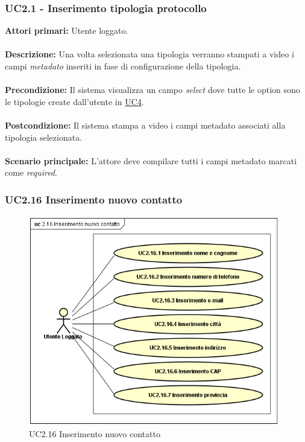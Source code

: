 \subsubsection{UC2.1 - Inserimento tipologia protocollo}
    \label{UC2.1}
    \textbf{Attori primari:} Utente loggato.
    \\
    \\
    \textbf{Descrizione:} Una volta selezionata una tipologia verranno stampati a video i campi \emph{metadato }\glsfirstoccur inseriti in fase di configurazione della tipologia.
    \\
    \\
    \textbf{Precondizione:} Il sistema visualizza un campo \textit{select} dove tutte le option sono le tipologie create dall'utente in \hyperref[UC4]{UC4}.
    \\
    \\
    \textbf{Postcondizione:} Il sistema stampa a video i campi metadato associati alla tipologia selezionata.
    \\
    \\
    \textbf{Scenario principale:} L'attore deve compilare tutti i campi metadato marcati come \textit{required}.
\newpage

\subsubsection{UC2.16 Inserimento nuovo contatto}
    \label{UC2.16}
    \begin{figure}[!h] 
        \centering 
        \includegraphics[width = 11cm]{immagini/UseCase/inserimentocontatto.png}
        \caption{UC2.16 Inserimento nuovo contatto}
    \end{figure}
    
